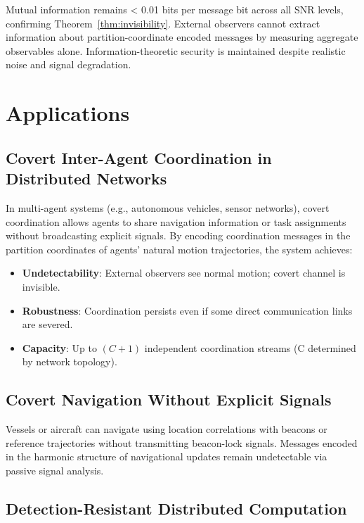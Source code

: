 \documentclass[11pt,twocolumn,a4paper]{article}
\theoremstyle{definition}
\begin{document}
Mutual information remains < 0.01 bits per message bit across all SNR levels, confirming Theorem~\ref{thm:invisibility}. External observers cannot extract information about partition-coordinate encoded messages by measuring aggregate observables alone. Information-theoretic security is maintained despite realistic noise and signal degradation.

\section{Applications}
\label{sec:applications}

\subsection{Covert Inter-Agent Coordination in Distributed Networks}

In multi-agent systems (e.g., autonomous vehicles, sensor networks), covert coordination allows agents to share navigation information or task assignments without broadcasting explicit signals. By encoding coordination messages in the partition coordinates of agents' natural motion trajectories, the system achieves:

\begin{itemize}[nosep]
\item \textbf{Undetectability}: External observers see normal motion; covert channel is invisible.
\item \textbf{Robustness}: Coordination persists even if some direct communication links are severed.
\item \textbf{Capacity}: Up to $(C+1)$ independent coordination streams (C determined by network topology).
\end{itemize}

\subsection{Covert Navigation Without Explicit Signals}

Vessels or aircraft can navigate using location correlations with beacons or reference trajectories without transmitting beacon-lock signals. Messages encoded in the harmonic structure of navigational updates remain undetectable via passive signal analysis.

\subsection{Detection-Resistant Distributed Computation}
\end{document}
